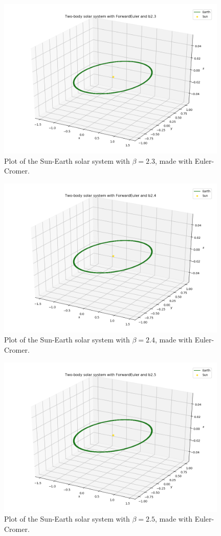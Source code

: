 \documentclass{article}
\begin{document}
    \begin{figure}[H]
        \centering
        \includegraphics[width = 11cm]{img/plot3D_S_E_F_b23.png}
        \caption{Plot of the Sun-Earth solar system with $\beta = 2.3$, made with Euler-Cromer.}
        \label{fig:plot3D_S_E_F_b23}
    \end{figure}

    \begin{figure}[H]
        \centering
        \includegraphics[width = 11cm]{img/plot3D_S_E_F_b24.png}
        \caption{Plot of the Sun-Earth solar system with $\beta = 2.4$, made with Euler-Cromer.}
        \label{fig:plot3D_S_E_F_b24}
    \end{figure}

    \begin{figure}[H]
        \centering
        \includegraphics[width = 11cm]{img/plot3D_S_E_F_b25.png}
        \caption{Plot of the Sun-Earth solar system with $\beta = 2.5$, made with Euler-Cromer.}
        \label{fig:plot3D_S_E_F_b25}
    \end{figure}
\end{document}
